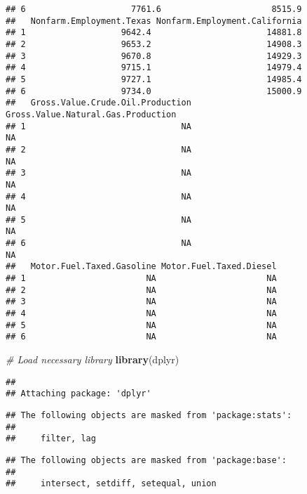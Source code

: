 \documentclass[
]{article}
\newenvironment{Shaded}{\begin{snugshade}}{\end{snugshade}}
\newcommand{\CommentTok}[1]{\textcolor[rgb]{0.56,0.35,0.01}{\textit{#1}}}
\newcommand{\FunctionTok}[1]{\textcolor[rgb]{0.13,0.29,0.53}{\textbf{#1}}}
\newcommand{\NormalTok}[1]{#1}
\begin{document}
\begin{verbatim}
## 6                     7761.6                      8515.9
##   Nonfarm.Employment.Texas Nonfarm.Employment.California
## 1                   9642.4                       14881.8
## 2                   9653.2                       14908.3
## 3                   9670.8                       14929.3
## 4                   9715.1                       14979.4
## 5                   9727.1                       14985.4
## 6                   9734.0                       15000.9
##   Gross.Value.Crude.Oil.Production Gross.Value.Natural.Gas.Production
## 1                               NA                                 NA
## 2                               NA                                 NA
## 3                               NA                                 NA
## 4                               NA                                 NA
## 5                               NA                                 NA
## 6                               NA                                 NA
##   Motor.Fuel.Taxed.Gasoline Motor.Fuel.Taxed.Diesel
## 1                        NA                      NA
## 2                        NA                      NA
## 3                        NA                      NA
## 4                        NA                      NA
## 5                        NA                      NA
## 6                        NA                      NA
\end{verbatim}

\begin{Shaded}
\begin{Highlighting}[]
\CommentTok{\# Load necessary library}
\FunctionTok{library}\NormalTok{(dplyr)}
\end{Highlighting}
\end{Shaded}

\begin{verbatim}
## 
## Attaching package: 'dplyr'
\end{verbatim}

\begin{verbatim}
## The following objects are masked from 'package:stats':
## 
##     filter, lag
\end{verbatim}

\begin{verbatim}
## The following objects are masked from 'package:base':
## 
##     intersect, setdiff, setequal, union
\end{verbatim}
\end{document}
